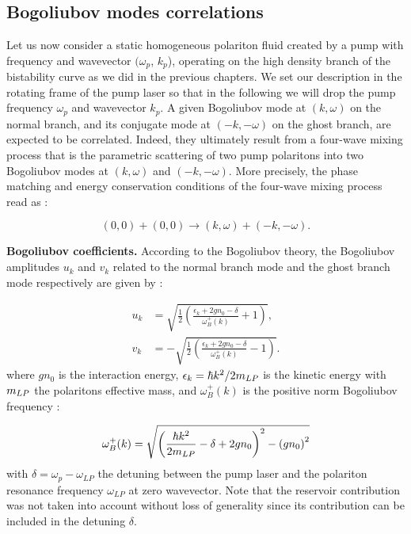 \subsection{Bogoliubov modes correlations}

Let us now consider a static homogeneous polariton fluid created by a pump with frequency and wavevector $(\omega_p$, $k_p$), operating on the high density branch of the bistability curve as we did in the previous chapters.
We set our description in the rotating frame of the pump laser so that in the following we will drop the pump frequency $\omega_p$ and wavevector $k_p$.
A given Bogoliubov mode at $(k,\omega)$ on the normal branch, and its conjugate mode at $(-k,-\omega)$ on the ghost branch, are expected to be correlated.
Indeed, they ultimately result from a four-wave mixing process that is the parametric scattering of two pump polaritons into two Bogoliubov modes at $(k,\omega)$ and $(-k,-\omega)$.
More precisely, the phase matching and energy conservation conditions of the four-wave mixing process read as :

\begin{equation}
    (0,0)+(0,0) \rightarrow (k,\omega)+( -k,-\omega).
\end{equation}

\textbf{Bogoliubov coefficients.} According to the Bogoliubov theory, the Bogoliubov amplitudes $u_{k}$ and $v_{k}$ related to the normal branch mode and the ghost branch mode respectively are given by \cite{castin_bose-einstein_2001,pitaevskij_bose-einstein_2016} :

\begin{align}
    u_k &= \sqrt{\frac{1}{2} \left( \frac{\epsilon_k + 2g n_0-\delta}{\omega^+_B(k)} + 1 \right)}, \\
    v_k &= -\sqrt{\frac{1}{2} \left( \frac{\epsilon_k + 2g n_0-\delta}{\omega^+_B(k)} - 1 \right)}.
\end{align}
where $gn_0$ is the interaction energy, $\epsilon_k=\hbar k^2/2m_{LP}$ is the kinetic energy with $m_{LP}$ the polaritons effective mass, and $\omega^+_B(k)$ is the positive norm Bogoliubov frequency :

\begin{equation}
    \omega^{+}_B(k)=\sqrt{\left(\dfrac{\hbar k^2}{2m_{LP}}-\delta +2g n_0\right)^2 - \left(g n_0\right)^2}
\end{equation}
with $\delta = \omega_p - \omega_{LP}$ the detuning between the pump laser and the polariton resonance frequency $\omega_{LP}$ at zero wavevector. Note that 
the reservoir contribution was not taken into account without loss of generality since its contribution can be included in the detuning $\delta$.

